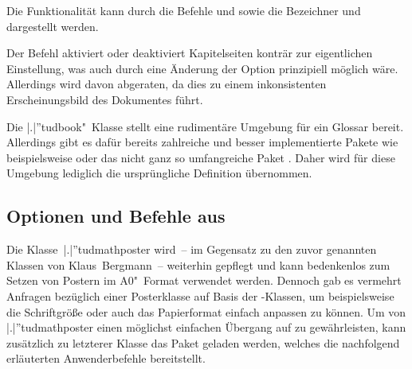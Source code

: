 \begin{DeclareEntity}{}
\begin{NoIndexDefault}
\begin{Declaration}
  {}
\printdeclarationlist

Die Funktionalität kann durch die Befehle  und 
 sowie die Bezeichner  und 
 dargestellt werden.
\end{Declaration}

\begin{Declaration}
  {}
\printdeclarationlist

Der Befehl aktiviert oder deaktiviert Kapitelseiten konträr zur eigentlichen 
Einstellung, was auch durch eine Änderung der Option  
prinzipiell möglich wäre. Allerdings wird davon abgeraten, da dies zu einem 
inkonsistenten Erscheinungsbild des Dokumentes führt.
\end{Declaration}

\begin{Declaration}
  {}
\begin{Declaration}
  {}
\printdeclarationlist

Die \Class|.|''{tudbook}"~Klasse stellt eine rudimentäre Umgebung für ein 
Glossar bereit. Allerdings gibt es dafür bereits zahlreiche und besser 
implementierte Pakete wie beispielsweise  oder das nicht 
ganz so umfangreiche Paket . Daher wird für diese Umgebung 
lediglich die ursprüngliche Definition übernommen. 
\end{Declaration}
\end{Declaration}
%



\subsection{%
  Optionen und Befehle aus %
}

%
Die Klasse~\Class|.|''{tudmathposter} wird~-- im Gegensatz zu den zuvor 
genannten Klassen von Klaus~Bergmann~-- weiterhin gepflegt und kann bedenkenlos 
zum Setzen von Postern im A0"~Format verwendet werden. Dennoch gab es vermehrt 
Anfragen bezüglich einer Posterklasse auf Basis der \TUDScript-Klassen, um 
beispielsweise die Schriftgröße oder auch das Papierformat einfach anpassen zu 
können. Um von \Class|.|''{tudmathposter} einen möglichst einfachen Übergang 
auf  zu gewährleisten, kann zusätzlich zu letzterer Klasse 
das Paket  geladen werden, welches die nachfolgend 
erläuterten Anwenderbefehle bereitstellt.


\end{NoIndexDefault}
\end{DeclareEntity}
